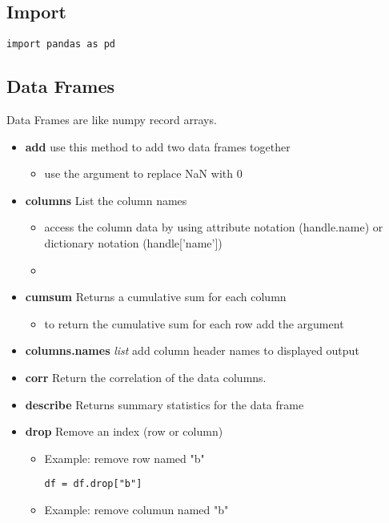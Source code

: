 \subsection{Import}
\begin{lstlisting}
import pandas as pd
\end{lstlisting}

\subsection{Data Frames}
Data Frames are like numpy record arrays.
\begin{itemize}
  \item \textbf{add} use this method to add two data frames together
    \begin{itemize}
      \item use the {\color{red}{fill\_value=0}} argument to replace NaN with 0
    \end{itemize}
  \item \textbf{columns} List the column names
    \begin{itemize}
      \item access the column data by using attribute notation (handle.name) or
        dictionary notation (handle['name'])
      \item \color{red}{If the column name is more than one word you must use
        the dictionary notation}
    \end{itemize}
  \item \textbf{cumsum} Returns a cumulative sum for each column
    \begin{itemize}
      \item to return the cumulative sum for each row add the argument
        \color{red}{axis=1}
    \end{itemize}
  \item \textbf{columns.names} \textit{list} add column header names to
    displayed output
  \item \textbf{corr} Return the correlation of the data columns.
  \item \textbf{describe} Returns summary statistics for the data frame
  \item \textbf{drop} Remove an index (row or column)
    \begin{itemize}
      \item Example: remove row named "b"
\begin{lstlisting}
df = df.drop["b"]
\end{lstlisting}
      \item Example: remove columun named "b"

\end{itemize}
\end{itemize}
